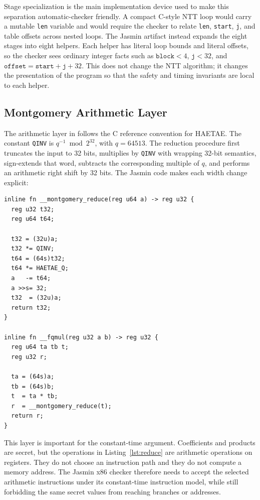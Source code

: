 \documentclass[10pt,twocolumn]{article}
\newcommand{\haetae}{HAETAE}
\newcommand{\jasmin}{Jasmin}
\newcommand{\ct}{constant-time}
\begin{document}
Stage specialization is the main implementation device used to make this
separation automatic-checker friendly.  A compact C-style NTT loop would carry
a mutable \texttt{len} variable and would require the checker to relate
\texttt{len}, \texttt{start}, \texttt{j}, and table offsets across nested loops.
The \jasmin{} artifact instead expands the eight stages into eight helpers.
Each helper has literal loop bounds and literal offsets, so the checker sees
ordinary integer facts such as \(\texttt{block}<4\), \(\texttt{j}<32\), and
\(\texttt{offset}=\texttt{start}+\texttt{j}+32\).  This does not change the NTT
algorithm; it changes the presentation of the program so that the safety and
timing invariants are local to each helper.

\subsection{Montgomery Arithmetic Layer}

The arithmetic layer in  follows the C reference convention
for \haetae{}.  The constant \texttt{QINV} is \(q^{-1}\bmod 2^{32}\), with
\(q=64513\).  The reduction procedure first truncates the input to 32 bits,
multiplies by \texttt{QINV} with wrapping 32-bit semantics, sign-extends that
word, subtracts the corresponding multiple of \(q\), and performs an
arithmetic right shift by 32 bits.  The \jasmin{} code makes each width change
explicit:
\newpage
\begin{lstlisting}[caption={Montgomery arithmetic in \texttt{reduce.jinc}.},label={lst:reduce}]
inline fn __montgomery_reduce(reg u64 a) -> reg u32 {
  reg u32 t32;
  reg u64 t64;

  t32 = (32u)a;
  t32 *= QINV;
  t64 = (64s)t32;
  t64 *= HAETAE_Q;
  a   -= t64;
  a >>s= 32;
  t32  = (32u)a;
  return t32;
}

inline fn __fqmul(reg u32 a b) -> reg u32 {
  reg u64 ta tb t;
  reg u32 r;

  ta = (64s)a;
  tb = (64s)b;
  t  = ta * tb;
  r  = __montgomery_reduce(t);
  return r;
}
\end{lstlisting}

This layer is important for the \ct{} argument.  Coefficients and products are
secret, but the operations in Listing~\ref{lst:reduce} are arithmetic
operations on registers.  They do not choose an instruction path and they do
not compute a memory address.  The \jasmin{} x86 checker therefore needs to
accept the selected arithmetic instructions under its constant-time instruction
model, while still forbidding the same secret values from reaching branches or
addresses.
\end{document}
